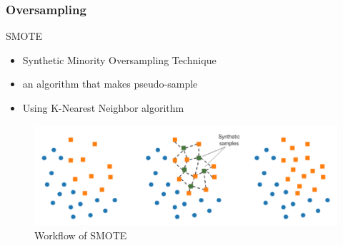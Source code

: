 \documentclass{beamer}
\begin{document}
    \begin{frame}
        \frametitle{Oversampling}

        \begin{block}{SMOTE \cite{SMOTE1}}
            \begin{itemize}
                \item Synthetic Minority Oversampling Technique
                \item an algorithm that makes pseudo-sample
                \item Using K-Nearest Neighbor algorithm
            \end{itemize}
        \end{block}

        \begin{figure}
            \includegraphics[width=0.8 \linewidth]{figures/SMOTE.png}
            \caption{Workflow of SMOTE}
        \end{figure}
    \end{frame}
\end{document}
